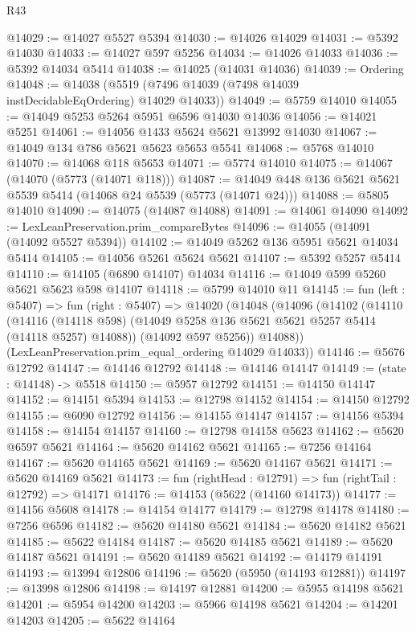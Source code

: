 \begin{lexlean}{R43}
\begin{coremodule}
@14029 := @14027 @5527 @5394
@14030 := @14026 @14029
@14031 := @5392 @14030
@14033 := @14027 @597 @5256
@14034 := @14026 @14033
@14036 := @5392 @14034 @5414
@14038 := @14025 (@14031 @14036)
@14039 := Ordering
@14048 := @14038 (@5519 (@7496 @14039 (@7498 @14039 instDecidableEqOrdering) @14029 @14033))
@14049 := @5759 @14010
@14055 := @14049 @5253 @5264 @5951 @6596 @14030 @14036
@14056 := @14021 @5251
@14061 := @14056 @1433 @5624 @5621 @13992 @14030
@14067 := @14049 @134 @786 @5621 @5623 @5653 @5541
@14068 := @5768 @14010
@14070 := @14068 @118 @5653
@14071 := @5774 @14010
@14075 := @14067 (@14070 (@5773 (@14071 @118)))
@14087 := @14049 @448 @136 @5621 @5621 @5539 @5414 (@14068 @24 @5539 (@5773 (@14071 @24)))
@14088 := @5805 @14010
@14090 := @14075 (@14087 @14088)
@14091 := @14061 @14090
@14092 := LexLeanPreservation.prim_compareBytes
@14096 := @14055 (@14091 (@14092 @5527 @5394))
@14102 := @14049 @5262 @136 @5951 @5621 @14034 @5414
@14105 := @14056 @5261 @5624 @5621
@14107 := @5392 @5257 @5414
@14110 := @14105 (@6890 @14107) @14034
@14116 := @14049 @599 @5260 @5621 @5623 @598 @14107
@14118 := @5799 @14010 @11
@14145 := fun (left : @5407) =>
  fun (right : @5407) =>
  @14020
    (@14048
      (@14096
        (@14102
          (@14110
            (@14116 (@14118 @598) (@14049 @5258 @136 @5621 @5621 @5257 @5414 (@14118 @5257) @14088))
            (@14092 @597 @5256))
          @14088))
      (LexLeanPreservation.prim_equal_ordering @14029 @14033))
@14146 := @5676 @12792
@14147 := @14146 @12792
@14148 := @14146 @14147
@14149 := (state : @14148) -> @5518
@14150 := @5957 @12792
@14151 := @14150 @14147
@14152 := @14151 @5394
@14153 := @12798 @14152
@14154 := @14150 @12792
@14155 := @6090 @12792
@14156 := @14155 @14147
@14157 := @14156 @5394
@14158 := @14154 @14157
@14160 := @12798 @14158 @5623
@14162 := @5620 @6597 @5621
@14164 := @5620 @14162 @5621
@14165 := @7256 @14164
@14167 := @5620 @14165 @5621
@14169 := @5620 @14167 @5621
@14171 := @5620 @14169 @5621
@14173 := fun (rightHead : @12791) => fun (rightTail : @12792) => @14171
@14176 := @14153 (@5622 (@14160 @14173))
@14177 := @14156 @5608
@14178 := @14154 @14177
@14179 := @12798 @14178
@14180 := @7256 @6596
@14182 := @5620 @14180 @5621
@14184 := @5620 @14182 @5621
@14185 := @5622 @14184
@14187 := @5620 @14185 @5621
@14189 := @5620 @14187 @5621
@14191 := @5620 @14189 @5621
@14192 := @14179 @14191
@14193 := @13994 @12806
@14196 := @5620 (@5950 (@14193 @12881))
@14197 := @13998 @12806
@14198 := @14197 @12881
@14200 := @5955 @14198 @5621
@14201 := @5954 @14200
@14203 := @5966 @14198 @5621
@14204 := @14201 @14203
@14205 := @5622 @14164

\end{coremodule}
\end{lexlean}
